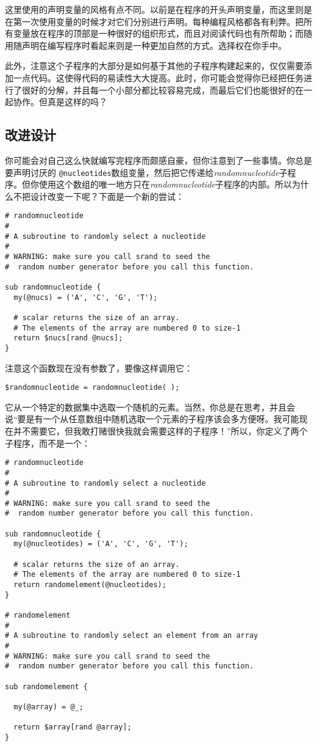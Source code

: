 这里使用的声明变量的风格有点不同。以前是在程序的开头声明变量，而这里则是在第一次使用变量的时候才对它们分别进行声明。每种编程风格都各有利弊。把所有变量放在程序的顶部是一种很好的组织形式，而且对阅读代码也有所帮助；而随用随声明在编写程序时看起来则是一种更加自然的方式。选择权在你手中。

此外，注意这个子程序的大部分是如何基于其他的子程序构建起来的，仅仅需要添加一点代码。这使得代码的易读性大大提高。此时，你可能会觉得你已经把任务进行了很好的分解，并且每一个小部分都比较容易完成，而最后它们也能很好的在一起协作。但真是这样的吗？

\subsection{改进设计}
你可能会对自己这么快就编写完程序而颇感自豪，但你注意到了一些事情。你总是要声明讨厌的 \verb|@nucleotides|数组变量，然后把它传递给\textit{randomnucleotide}子程序。但你使用这个数组的唯一地方只在\textit{randomnucleotide}子程序的内部。所以为什么不把设计改变一下呢？下面是一个新的尝试：

\begin{lstlisting}
# randomnucleotide
#
# A subroutine to randomly select a nucleotide
#
# WARNING: make sure you call srand to seed the
#  random number generator before you call this function.

sub randomnucleotide {
  my(@nucs) = ('A', 'C', 'G', 'T');

  # scalar returns the size of an array. 
  # The elements of the array are numbered 0 to size-1
  return $nucs[rand @nucs];
}
\end{lstlisting}

注意这个函数现在没有参数了，要像这样调用它：

\begin{lstlisting}
$randomnucleotide = randomnucleotide( );
\end{lstlisting}

它从一个特定的数据集中选取一个随机的元素。当然，你总是在思考，并且会说“要是有一个从任意数组中随机选取一个元素的子程序该会多方便呀。我可能现在并不需要它，但我敢打赌很快我就会需要这样的子程序！”所以，你定义了两个子程序，而不是一个：

\begin{lstlisting}
# randomnucleotide
#
# A subroutine to randomly select a nucleotide
#
# WARNING: make sure you call srand to seed the
#  random number generator before you call this function.

sub randomnucleotide {
  my(@nucleotides) = ('A', 'C', 'G', 'T');

  # scalar returns the size of an array. 
  # The elements of the array are numbered 0 to size-1
  return randomelement(@nucleotides);
}

# randomelement
#
# A subroutine to randomly select an element from an array
#
# WARNING: make sure you call srand to seed the
#  random number generator before you call this function.

sub randomelement {

  my(@array) = @_;

  return $array[rand @array];
}
\end{lstlisting}

